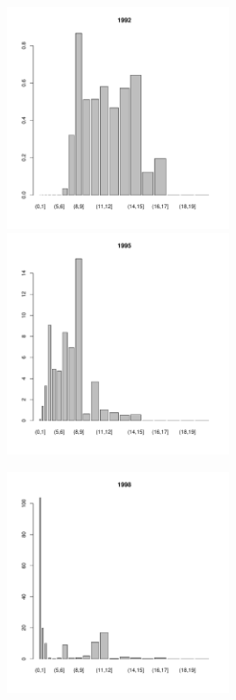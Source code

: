 \documentclass[12pt, a4paper]{article}
\begin{document}



\begin{figure}[h]

\begin{multicols}{3}
\hfill
\includegraphics[width=65mm]{../White_Sea/Estuatiy_Luvenga/sizestr_percents_1992_.pdf}
\hfill
\includegraphics[width=65mm]{../White_Sea/Estuatiy_Luvenga/sizestr_percents_1995_.pdf}

\hfill
\includegraphics[width=65mm]{../White_Sea/Estuatiy_Luvenga/sizestr_percents_1998_.pdf}


\end{multicols}
\end{figure}
\end{document}

